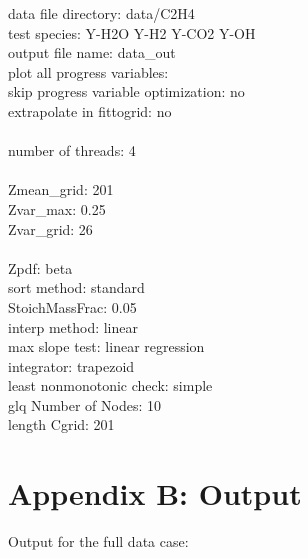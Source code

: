 \documentclass[11pt]{article}
\begin{document}
\hfill\begin{minipage}{\dimexpr\textwidth-3cm}
data file directory:	data/C2H4 \\
test species:	Y-H2O	Y-H2	Y-CO2	Y-OH \\
output file name:	data\_out \\
plot all progress variables:	\\
skip progress variable optimization:	no \\
extrapolate in fittogrid:	no \\
\\
number of threads:	4 \\
\\
Zmean\_grid:	201 \\
Zvar\_max:	0.25 \\ 
Zvar\_grid:	26 \\
\\
Zpdf:	beta \\
sort method:	standard \\
StoichMassFrac:	0.05 \\ 
interp method:	linear \\ 
max slope test:	linear regression \\
integrator:	trapezoid \\
least nonmonotonic check:	simple \\

glq Number of Nodes:	10 \\
length Cgrid:	201 \\

\xdef\tpd{\the\prevdepth}
\end{minipage}


\clearpage
\section*{Appendix B: Output}

Output for the full data case:
\vspace{12pt}
\end{document}

